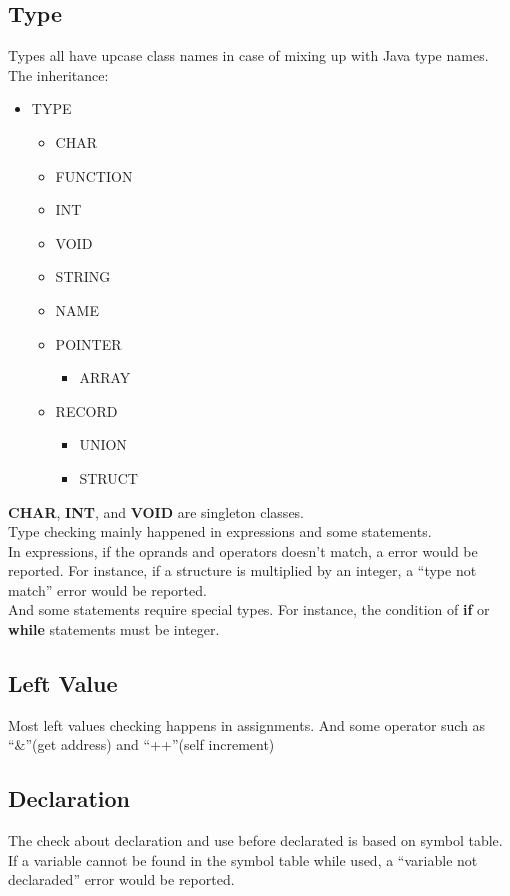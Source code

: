 \documentclass[nocopyrightspace]{sigplanconf}
\begin{document}
\subsection{Type}
	Types all have upcase class names in case of mixing up with Java type names. \\
	The inheritance:
	\begin{itemize}
		\item TYPE
		\begin{itemize}
			\item CHAR
			\item FUNCTION
			\item INT
			\item VOID
			\item STRING
			\item NAME
			\item POINTER
			\begin{itemize}
				\item ARRAY
			\end{itemize}
			\item RECORD
			\begin{itemize}
				\item UNION
				\item STRUCT
			\end{itemize}
		\end{itemize}
	\end{itemize}
	\textbf{CHAR},\textbf{ INT}, and \textbf{VOID} are singleton classes.\\
	Type checking mainly happened in expressions and some statements.\\
	In expressions, if the oprands and operators doesn't match, a error would be reported. For instance, if a structure is multiplied by an integer, a ``type not match'' error would be reported.\\
	And some statements require special types. For instance, the condition of \textbf{if} or \textbf{while} statements must be integer.

\subsection{Left Value}
	Most left values checking happens in assignments. And some operator such as ``\&''(get address) and ``++''(self increment)\\
	
\subsection{Declaration}
	The check about declaration and use before declarated is based on symbol table. If a variable cannot be found in the symbol table while used, a ``variable not declaraded'' error would be reported.
	
\end{document}
